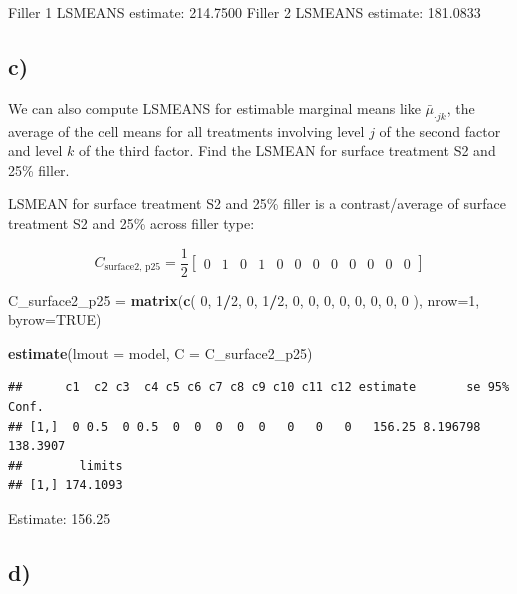 \documentclass[
]{article}
\newenvironment{Shaded}{\begin{snugshade}}{\end{snugshade}}
\newcommand{\AttributeTok}[1]{\textcolor[rgb]{0.13,0.29,0.53}{#1}}
\newcommand{\ConstantTok}[1]{\textcolor[rgb]{0.56,0.35,0.01}{#1}}
\newcommand{\DecValTok}[1]{\textcolor[rgb]{0.00,0.00,0.81}{#1}}
\newcommand{\FunctionTok}[1]{\textcolor[rgb]{0.13,0.29,0.53}{\textbf{#1}}}
\newcommand{\NormalTok}[1]{#1}
\newcommand{\OtherTok}[1]{\textcolor[rgb]{0.56,0.35,0.01}{#1}}
\newcommand{\SpecialCharTok}[1]{\textcolor[rgb]{0.81,0.36,0.00}{\textbf{#1}}}
\begin{document}
Filler 1 LSMEANS estimate: 214.7500 Filler 2 LSMEANS estimate: 181.0833

\newpage

\subsection{c)}\label{c}

We can also compute LSMEANS for estimable marginal means like
\(\bar{\mu}_{\cdot jk}\), the average of the cell means for all
treatments involving level \(j\) of the second factor and level \(k\) of
the third factor. Find the LSMEAN for surface treatment S2 and 25\%
filler.

LSMEAN for surface treatment S2 and 25\% filler is a contrast/average of
surface treatment S2 and 25\% across filler type:

\[
C_{\text{surface2, p25}} = \frac{1}{2} 
\begin{bmatrix}
0 & 1 & 0 & 1 & 0 & 0 & 0 & 0 & 0 & 0 & 0 & 0
\end{bmatrix}
\]

\begin{Shaded}
\begin{Highlighting}[]
\NormalTok{C\_surface2\_p25 }\OtherTok{=} \FunctionTok{matrix}\NormalTok{(}\FunctionTok{c}\NormalTok{(}
  \DecValTok{0}\NormalTok{, }\DecValTok{1}\SpecialCharTok{/}\DecValTok{2}\NormalTok{, }\DecValTok{0}\NormalTok{, }\DecValTok{1}\SpecialCharTok{/}\DecValTok{2}\NormalTok{, }\DecValTok{0}\NormalTok{, }\DecValTok{0}\NormalTok{, }\DecValTok{0}\NormalTok{, }\DecValTok{0}\NormalTok{, }\DecValTok{0}\NormalTok{, }\DecValTok{0}\NormalTok{, }\DecValTok{0}\NormalTok{, }\DecValTok{0}
\NormalTok{), }\AttributeTok{nrow=}\DecValTok{1}\NormalTok{, }\AttributeTok{byrow=}\ConstantTok{TRUE}\NormalTok{)}

\FunctionTok{estimate}\NormalTok{(}\AttributeTok{lmout =}\NormalTok{ model, }\AttributeTok{C =}\NormalTok{ C\_surface2\_p25)}
\end{Highlighting}
\end{Shaded}

\begin{verbatim}
##      c1  c2 c3  c4 c5 c6 c7 c8 c9 c10 c11 c12 estimate       se 95% Conf.
## [1,]  0 0.5  0 0.5  0  0  0  0  0   0   0   0   156.25 8.196798  138.3907
##        limits
## [1,] 174.1093
\end{verbatim}

Estimate: 156.25

\subsection{d)}\label{d}
\end{document}
